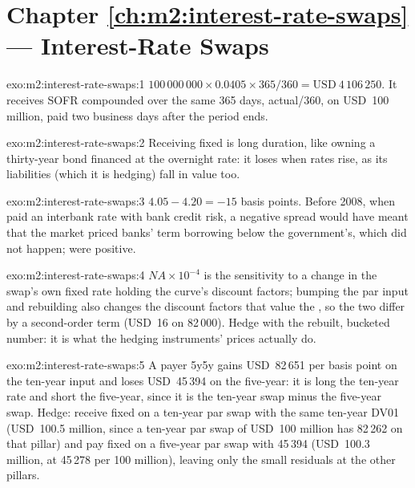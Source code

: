 \section*{Chapter \ref{ch:m2:interest-rate-swaps} --- Interest-Rate Swaps}

\begin{solution}{exo:m2:interest-rate-swaps:1}
$100\,000\,000 \times 0.0405 \times 365/360 = \text{USD}~4\,106\,250$. It receives SOFR
compounded over the same 365 days, actual/360, on USD~100 million, paid two
business days after the period ends.
\end{solution}

\begin{solution}{exo:m2:interest-rate-swaps:2}
Receiving fixed is long duration, like owning a thirty-year bond financed at
the overnight rate: it loses when rates rise, as its liabilities (which it is
hedging) fall in value too.
\end{solution}

\begin{solution}{exo:m2:interest-rate-swaps:3}
$4.05 - 4.20 = -15$ basis points. Before 2008, when  paid an
interbank rate with bank credit risk, a negative spread would have meant that
the market priced banks' term borrowing below the government's, which did not
happen;  were positive.
\end{solution}

\begin{solution}{exo:m2:interest-rate-swaps:4}
$N A \times 10^{-4}$ is the sensitivity to a change in the swap's own fixed rate
holding the curve's discount factors; bumping the par input and rebuilding also
changes the discount factors that value the , so the two differ by a
second-order term (USD~16 on 82\,000). Hedge with the rebuilt, bucketed number:
it is what the hedging instruments' prices actually do.
\end{solution}

\begin{solution}{exo:m2:interest-rate-swaps:5}
A payer 5y5y gains USD~82\,651 per basis point on the ten-year input and loses
USD~45\,394 on the five-year: it is long the ten-year rate and short the five-year,
since it is the ten-year swap minus the five-year swap. Hedge: receive fixed on
a ten-year par swap with the same ten-year DV01 (USD~100.5 million, since a
ten-year par swap of USD~100 million has 82\,262 on that pillar) and pay fixed
on a five-year par swap with 45\,394 (USD~100.3 million, at 45\,278 per 100
million), leaving only the small residuals at the other pillars.
\end{solution}

